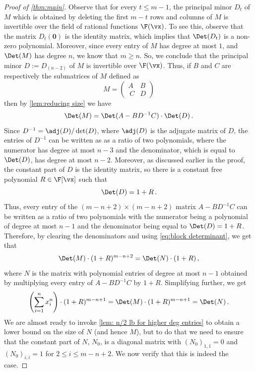 \begin{proof}[Proof of \autoref{thm:main}]
Observe that for every $t \leq m-1$, the principal minor $D_t$ of $M$ which is obtained by deleting the first $m -t$ rows and columns of $M$ is invertible over the field of rational functions $\F(\vx)$. To see this, observe that the matrix $D_t(\mathbf{0})$ is the identity matrix, which implies that $\Det(D_t)$ is a non-zero polynomial. Moreover, since every entry of $M$ has degree at most $1$, and $\Det(M)$ has degree $n$, we know that $m \geq n$. So, we conclude that the principal minor $D := D_{(n-2)}$ of $M$ is invertible over $\F(\vx)$. Thus, if $B$ and $C$ are respectively the submatrices of $M$ defined as 
\[ M = \begin{pmatrix}
   A & B\\\
C & D
 \end{pmatrix}
 \]
then by \autoref{lem:reducing size} we have 
 \begin{equation}\label{eq:block determinant}
 \Det(M)  = \Det(A - BD^{-1}C)\cdot \Det(D) \, .
 \end{equation}
Since $D^{-1} = \adj(D)/\det(D)$, where $\adj(D)$ is the adjugate matrix of $D$, the entries of $D^{-1}$ can be written as as a ratio of two polynomials, where the numerator has degree at most $n-3$ and the denominator, which is equal to $\Det(D)$, has degree at most $n-2$. Moreover, as discussed earlier in the proof, 
the constant part of $D$ is the identity matrix, so there is a constant free polynomial $R \in \F[\vx]$
such that 
\[
\Det(D) = 1 + R \, .
\]
Thus, every entry of the $(m-n+2) \times (m-n+2)$ matrix $A - BD^{-1}C$ can be written as a ratio of two polynomials with the numerator being a polynomial of degree at most $n-1$ and the denominator being equal to $\Det(D)= 1 + R$. Therefore, by clearing the denominators and using \eqref{eq:block determinant}, we get that 
 \[
 \Det(M) \cdot (1 + R)^{m - n + 2}  = \Det(N)\cdot (1 + R) \, ,
 \]
 where $N$ is the matrix with polynomial entries of degree at most $n-1$ obtained by multiplying every entry of $A - BD^{-1}C$ by $1 + R$. Simplifying further, we get 
 \[
 \left(\sum_{i=1}^n x_i^n \right) \cdot (1+R)^{m-n+1} = \Det(M) \cdot (1 + R)^{m - n + 1}  = \Det(N)\, .
 \]
 We are almost ready to invoke \autoref{lem: n/2 lb for higher deg entries} to obtain a lower bound on the size of $N$ (and hence $M$), but to do that we need to ensure that the constant part of $N$, $N_0$, is a diagonal matrix with $(N_0)_{1,1}=0$ and $(N_0)_{i,i}=1$ for $2 \le i\le m-n+2$. We now verify that this is indeed the case. 
 

\end{proof}
